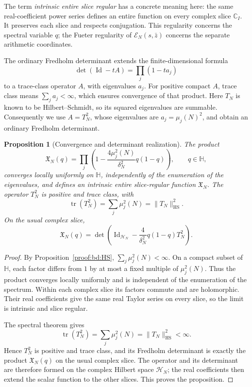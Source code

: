 \documentclass[12pt,a4paper]{amsart}
\numberwithin{equation}{section}
\theoremstyle{plain}
\newtheorem{proposition}{Proposition}[section]
\theoremstyle{definition}
\theoremstyle{remark}
\begin{document}
The term \emph{intrinsic entire slice regular} has a concrete meaning
here: the same real-coefficient power series defines an entire
function on every complex slice $\mathbb C_I$. It preserves each
slice and respects conjugation. This regularity concerns the spectral
variable $q$; the Fueter regularity of $\mathscr E_N(s,\bar z)$
concerns the separate arithmetic coordinates.

The ordinary Fredholm determinant extends the finite-dimensional formula
\[
 \det(\operatorname{Id}-tA)=\prod_j(1-ta_j)
\]
to a trace-class operator $A$, with eigenvalues $a_j$.
For positive compact $A$,
trace class means
$\sum_j a_j<\infty$, which ensures convergence of that product.
Here $T_N$ is known to be Hilbert--Schmidt, so its squared eigenvalues
are summable. Consequently we use $A=T_N^2$, whose eigenvalues are
$a_j=\mu_j(N)^2$, and obtain an ordinary Fredholm determinant.

\begin{proposition}[Convergence and determinant realization]
\label{proof:v9:spectral-convergence}
The product
\[
 \mathfrak X_N(q)=
 \prod_j\left(1-\frac{4\mu_j^2(N)}{\delta_N^2}q(1-q)\right),
 \qquad q\in\mathbb H,
\]
converges locally uniformly on
$\mathbb H$, independently of the enumeration of the eigenvalues, and
defines an intrinsic entire slice-regular function $\mathfrak X_N$.
The operator $T_N^2$ is positive and trace class, with
\[
 \operatorname{tr}(T_N^2)=\sum_j\mu_j^2(N)
                       =\|T_N\|_{\mathrm{HS}}^2.
\]
On the usual complex slice,
\[
 \mathfrak X_N(q)=\det\left(\operatorname{Id}_{\mathcal H_N}
       -\frac4{\delta_N^2}q(1-q)T_N^2\right).
\]
\end{proposition}

\begin{proof}
By Proposition~\ref{proof:bd:HS}, $\sum_j\mu_j^2(N)<\infty$.
On a compact subset of $\mathbb H$, each factor differs from $1$ by
at most a fixed multiple of $\mu_j^2(N)$. Thus the product converges
locally uniformly and is independent of the enumeration of the spectrum.
Within each complex slice its factors commute and are holomorphic.
Their real coefficients give the same real Taylor series on every slice,
so the limit is intrinsic and slice regular.

The spectral theorem gives
\[
 \operatorname{tr}(T_N^2)=\sum_j\mu_j^2(N)
                       =\|T_N\|_{\mathrm{HS}}^2<\infty.
\]
Hence $T_N^2$ is positive and trace class, and its Fredholm determinant
is exactly the product $\mathfrak X_N(q)$ on the usual complex slice. The operator and its determinant are therefore formed
on the complex Hilbert space $\mathcal H_N$; the real coefficients
then extend the scalar function to the other slices.
This proves the proposition.
\end{proof}
\end{document}
